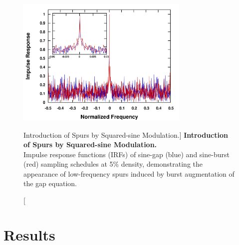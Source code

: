 \begin{figure}
\includegraphics[width=3.25in]{figs/dgs/09-spurs.png}
\caption
      [Introduction of Spurs by Squared-sine Modulation.]{
  {\bf Introduction of Spurs by Squared-sine Modulation.}
  \\
  Impulse response functions (IRFs) of sine-gap (blue) and sine-burst (red)
  sampling schedules at 5\% density, demonstrating the appearance of
  low-frequency spurs induced by burst augmentation of the gap equation.
}
\label{figure.2.9}
\end{figure}

\section{Results}

